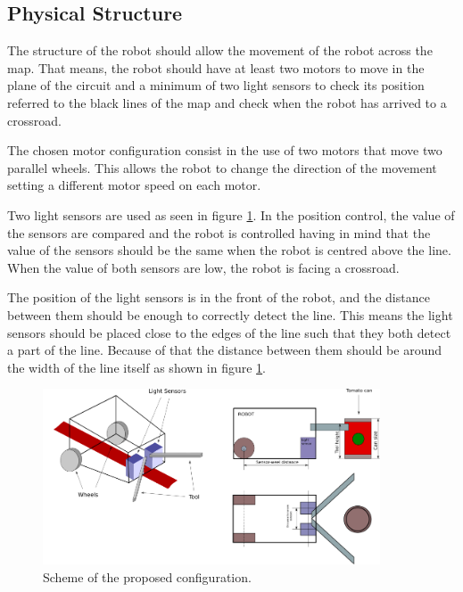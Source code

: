 \subsection{Physical Structure}
The structure of the robot should allow the movement of the robot across the map. 
That means, the robot should have at least two motors to move in the plane of the circuit and a minimum of two light sensors to check its position referred to the black lines of the map and check when the robot has arrived to a crossroad.

The chosen motor configuration consist in the use of two motors that move two parallel wheels. 
This allows the robot to change the direction of the movement setting a different motor speed on each motor.


Two light sensors are used as seen in figure \ref{fig:robotscheme}. 
In the position control, the value of the sensors are compared and the robot is controlled having in mind that the value of the sensors should be the same when the robot is centred above the line.
When the value of both sensors are low, the robot is facing a crossroad.

The position of the light sensors is in the front of the robot, and the distance between them should be enough to correctly detect the line. 
This means the light sensors should be placed close to the edges of the line such that they both detect a part of the line.
Because of that the distance between them should be around the width of the line itself as shown in figure \ref{fig:robotscheme}.


\begin{figure}[H]
\includegraphics[width=10cm]{Fig2.png}
\centering
\caption{Scheme of the proposed configuration.}
\label{fig:robotscheme}
\end{figure}


